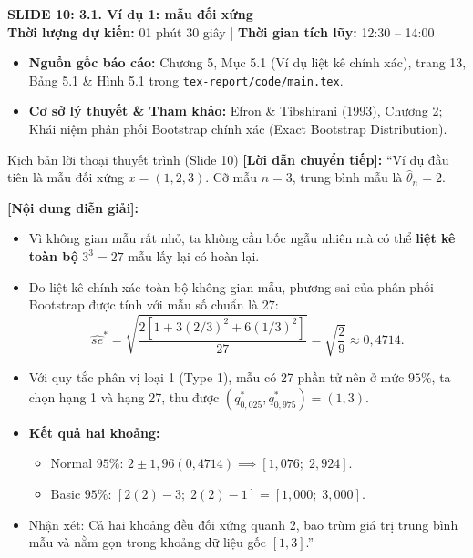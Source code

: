 \documentclass[10pt,a4paper]{article}
\newcommand{\slideheader}[4]{
    \vspace{0.4cm}
    \begin{tcolorbox}[colback=primary!7!white, colframe=primary, arc=2mm, boxrule=1pt, left=4mm, right=4mm, top=2.5mm, bottom=2.5mm]
        {\Large\bfseries\color{primary} SLIDE #1: #2}\\[0.1cm]
        {\small\textbf{Thời lượng dự kiến:} #3 \quad | \quad \textbf{Thời gian tích lũy:} #4}
    \end{tcolorbox}
    \vspace{0.15cm}
}
\begin{document}
\newpage

\slideheader{10}{3.1. Ví dụ 1: mẫu đối xứng}{01 phút 30 giây}{12:30 -- 14:00}

\begin{itemize}
    \item \textbf{Nguồn gốc báo cáo:} Chương 5, Mục 5.1 (Ví dụ liệt kê chính xác), trang 13, Bảng 5.1 \& Hình 5.1 trong \texttt{tex-report/code/main.tex}.
    \item \textbf{Cơ sở lý thuyết \& Tham khảo:} Efron \& Tibshirani (1993), Chương 2; Khái niệm phân phối Bootstrap chính xác (Exact Bootstrap Distribution).
\end{itemize}

\begin{scriptbox}{Kịch bản lời thoại thuyết trình (Slide 10)}
    \textbf{[Lời dẫn chuyển tiếp]:} ``Ví dụ đầu tiên là mẫu đối xứng $x = (1, 2, 3)$. Cỡ mẫu $n=3$, trung bình mẫu là $\hat\theta_n = 2$.
    
    \textbf{[Nội dung diễn giải]:} 
    \begin{itemize}
        \item Vì không gian mẫu rất nhỏ, ta không cần bốc ngẫu nhiên mà có thể \textbf{liệt kê toàn bộ} $3^3 = 27$ mẫu lấy lại có hoàn lại.
        \item Do liệt kê chính xác toàn bộ không gian mẫu, phương sai của phân phối Bootstrap được tính với mẫu số chuẩn là $27$:
        \[
        \widehat{se}^* = \sqrt{\frac{2\left[1 + 3(2/3)^2 + 6(1/3)^2\right]}{27}} = \sqrt{\frac{2}{9}} \approx 0{,}4714.
        \]
        \item Với quy tắc phân vị loại 1 (Type 1), mẫu có 27 phần tử nên ở mức $95\%$, ta chọn hạng 1 và hạng 27, thu được $(q_{0{,}025}^*, q_{0{,}975}^*) = (1, 3)$.
        \item \textbf{Kết quả hai khoảng:}
        \begin{itemize}
            \item Normal $95\%$: $2 \pm 1{,}96(0{,}4714) \implies [1{,}076;\; 2{,}924]$.
            \item Basic $95\%$: $[2(2) - 3;\; 2(2) - 1] = [1{,}000;\; 3{,}000]$.
        \end{itemize}
        \item Nhận xét: Cả hai khoảng đều đối xứng quanh $2$, bao trùm giá trị trung bình mẫu và nằm gọn trong khoảng dữ liệu gốc $[1, 3]$.''
    \end{itemize}
\end{scriptbox}
\end{document}
